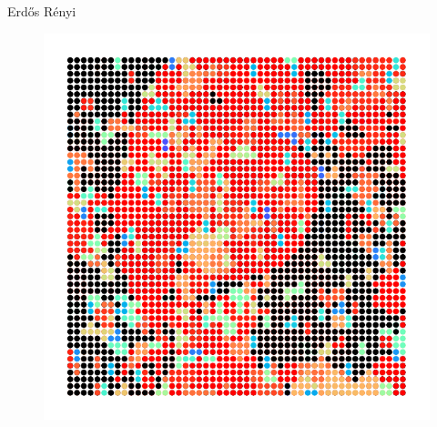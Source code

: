 \documentclass{beamer}
\newcommand{\ER}{Erd\H{o}s R\'enyi\xspace}
\begin{document}
\begin{frame}{\ER}
        \begin{figure}[H]
                \centering
                \includegraphics[scale=0.7]{fig/postcrit.pdf}
        \end{figure}
\end{frame}
\end{document}
